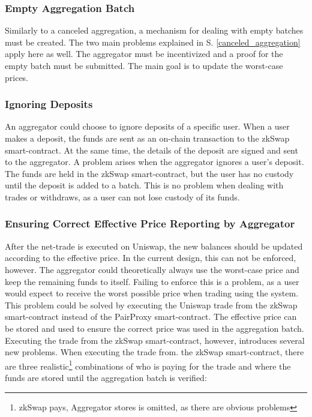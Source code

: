 \documentclass[../../thesis.tex]{subfiles}
\begin{document}
\subsubsection{Empty Aggregation Batch}
Similarly to a canceled aggregation, a mechanism for dealing with empty batches must be created. The two main problems explained in S. \ref{canceled_aggregation} apply here as well. The aggregator must be incentivized and a proof for the empty batch must be submitted. The main goal is to update the worst-case prices.

\subsubsection{Ignoring Deposits}
An aggregator could choose to ignore deposits of a specific user. When a user makes a deposit, the funds are sent as an on-chain transaction to the zkSwap smart-contract.  At the same time, the details of the deposit are signed and sent to the aggregator. A problem arises when the aggregator ignores a user's deposit. The funds are held in the zkSwap smart-contract, but the user has no custody until the deposit is added to a batch. This is no problem when dealing with trades or withdraws, as a user can not lose custody of its funds. 

\subsubsection{Ensuring Correct Effective Price Reporting by Aggregator} \label{correct_price}
After the net-trade is executed on Uniswap, the new balances should be updated according to the effective price. In the current design, this can not be enforced, however. The aggregator could theoretically always use the worst-case price and keep the remaining funds to itself. Failing to enforce this is a problem, as a user would expect to receive the worst possible price when trading using the system. This problem could be solved by executing the Uniswap trade from the zkSwap smart-contract instead of the PairProxy smart-contract.  The effective price can be stored and used to ensure the correct price was used in the aggregation batch. Executing the trade from the zkSwap smart-contract, however, introduces several new problems. When executing the trade from. the zkSwap smart-contract, there are three realistic\footnote{zkSwap pays, Aggregator stores is omitted, as there are obvious problems} combinations of who is paying for the trade and where the funds are stored until the aggregation batch is verified: 
\end{document}
